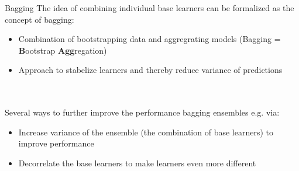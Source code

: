 \documentclass[11pt,compress,t,notes=noshow, xcolor=table]{beamer}
\begin{document}
\begin{vbframe}{Bagging}
The idea of combining individual base learners can be formalized as the concept of bagging:
\begin{itemize}
  \item Combination of bootstrapping data and aggregrating models (Bagging = \textbf{B}ootstrap \textbf{Agg}regation)
  \item Approach to stabelize learners and thereby reduce variance of predictions
\end{itemize}
\ \\
\ \\
Several ways to further improve the performance bagging ensembles e.g. via:
\begin{itemize}
  \item Increase variance of the ensemble (the combination of base learners) to improve performance
  \item Decorrelate the base learners to make learners even more different
\end{itemize}
\end{vbframe}
\end{document}
